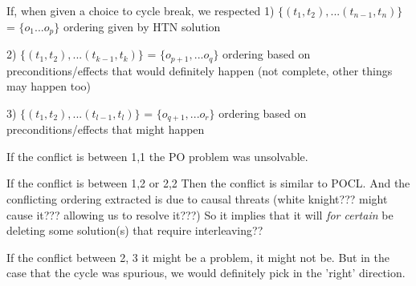 If, when given a choice to cycle break, we respected 
1) $\{(t_1, t_2), ... (t_{n-1}, t_n )\}$ = $\{o_1 ... o_p \}$ ordering given by HTN solution

2) $\{(t_1, t_2), ... (t_{k-1}, t_k )\}$ = $\{o_{p+1}, ... o_q\}$ ordering based on preconditions/effects that would definitely happen (not complete, other things may happen too)

3) $\{(t_1, t_2), ... (t_{l-1}, t_l )\}$ = $\{o_{q+1}, ... o_r\}$ ordering based on preconditions/effects that might happen

If the conflict is between 1,1 the PO problem was unsolvable.

If the conflict is between 1,2 or 2,2
Then the conflict is similar to POCL.
And the conflicting  ordering extracted is due to causal threats (white knight??? might cause it??? allowing us to resolve it???)
So it implies that it will \emph{for certain} be deleting some solution(s) that require interleaving??

If the conflict between 2, 3 it might be a problem, it might not be. But in the case that the cycle was spurious, we would definitely pick in the 'right' direction.



